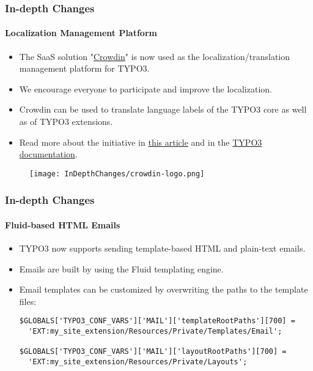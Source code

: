 
\begin{frame}[fragile]
	\frametitle{In-depth Changes}
	\framesubtitle{Localization Management Platform}

	\begin{itemize}
		\item The SaaS solution "\href{https://crowdin.com/}{Crowdin}" is now used as
			the localization/translation management platform for TYPO3.
		\item We encourage everyone to participate and improve the localization.
		\item Crowdin can be used to translate language labels of the TYPO3 core
			as well as of TYPO3 extensions.
		\item Read more about the initiative in
			\href{https://typo3.org/community/teams/typo3-development/initiatives/localization-with-crowdin/}{this article}
			and in the
			\href{https://docs.typo3.org/m/typo3/reference-coreapi/master/en-us/ApiOverview/Internationalization/TranslationServer/Crowdin.html}{TYPO3 documentation}.
	\end{itemize}

	\begin{figure}
		\texttt{[image: InDepthChanges/crowdin-logo.png]}
	\end{figure}

\end{frame}


\begin{frame}[fragile]
	\frametitle{In-depth Changes}
	\framesubtitle{Fluid-based HTML Emails}

	\lstset{basicstyle=\smaller\ttfamily}

	\begin{itemize}
		\item TYPO3 now supports sending template-based HTML and plain-text emails.
		\item Emails are built by using the Fluid templating engine.
		\item Email templates can be customized by overwriting the paths to the template files:
\begin{lstlisting}
$GLOBALS['TYPO3_CONF_VARS']['MAIL']['templateRootPaths'][700] =
  'EXT:my_site_extension/Resources/Private/Templates/Email';

$GLOBALS['TYPO3_CONF_VARS']['MAIL']['layoutRootPaths'][700] =
  'EXT:my_site_extension/Resources/Private/Layouts';
\end{lstlisting}

	\end{itemize}

\end{frame}

